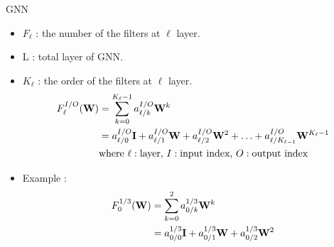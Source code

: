 \documentclass[hyperref={bookmarks=false}]{beamer}
\numberwithin{figure}{section}
\begin{document}
\begin{frame}{GNN}
\begin{itemize}
    \item $F_{\ell}$ : the number of the filters at $\ell$ layer. 
    \item L : total layer of GNN.
    \item $K_{\ell}$ : the order of the filters at $\ell$ layer.
    \begin{align}
        F_{\ell}^{I/O}({\bf W}) 
        &= \displaystyle\sum^{K_{\ell}-1}_{k=0}a_{\ell/k}^{I/O}{\bf W}^{k} \\
        &= a_{\ell/0}^{I/O}{\bf I} + a_{\ell/1}^{I/O}{\bf W} + a_{\ell/2}^{I/O}{\bf W}^{2} + \ldots + a_{\ell/K_{\ell-1}}^{I/O}{\bf W}^{K_{\ell}-1} \\
        & \text{where }  \ell:\text{layer, } I:\text{input index, } O:\text{output index }
    \end{align}
    \item Example : 
    \begin{align}
        F_{0}^{1/3}({\bf W}) &= \displaystyle\sum^{2}_{k=0}a_{0/k}^{1/3}{\bf W}^{k} \\
        &= a_{0/0}^{1/3}{\bf I} + a_{0/1}^{1/3}{\bf W} + a_{0/2}^{1/3}{\bf W}^{2}
    \end{align}
\end{itemize}
\end{frame}
\end{document}

